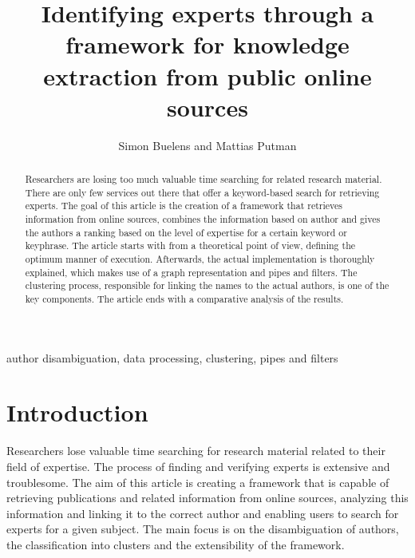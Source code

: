 \documentclass[9pt, twocolumn]{phdsymp} %
\begin{document}
\title{Identifying experts through a framework for knowledge extraction from public online sources} %

\author{Simon Buelens and Mattias Putman}


\maketitle

\begin{abstract} 

Researchers are losing too much valuable time searching for related research material. There are only few services out there that offer a keyword-based search for retrieving experts. The goal of this article is the creation of a framework that retrieves information from online sources, combines the information based on author and gives the authors a ranking based on the level of expertise for a certain keyword or keyphrase. The article starts with from a theoretical point of view, defining the optimum manner of execution. Afterwards, the actual implementation is thoroughly explained, which makes use of a graph representation and pipes and filters. The clustering process, responsible for linking the names to the actual authors, is one of the key components. The article ends with a comparative analysis of the results.

\end{abstract}

\begin{keywords}
author disambiguation, data processing, clustering, pipes and filters
\end{keywords}

\section{Introduction}

Researchers lose valuable time searching for research material related to their field of expertise. The process of finding and verifying experts is extensive and troublesome. The aim of this article is creating a framework that is capable of retrieving publications and related information from online sources, analyzing this information and linking it to the correct author and enabling users to search for experts for a given subject. The main focus is on the disambiguation of authors, the classification into clusters and the extensibility of the framework.
\end{document}
